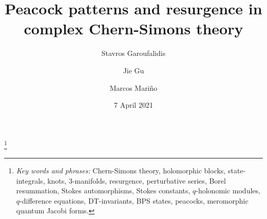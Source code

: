 \documentclass[12pt,reqno]{amsart}
\theoremstyle{definition}
\def\md{\mathbf}
\newcommand{\knot}[1]{\md{#1}}
\begin{document}
\title[Peacock patterns and resurgence in complex Chern-Simons
theory]{Peacock patterns and resurgence in
  complex Chern-Simons theory} \author{Stavros Garoufalidis}
\address{%
  International Center for Mathematics, Department of Mathematics \\
  Southern University of Science and Technology \\
  Shenzhen, China \newline
  {\tt \url{http://people.mpim-bonn.mpg.de/stavros}}}
\author{Jie Gu}
\address{D\'epartement de Physique Th\'eorique, Universit\'e de Gen\`eve \\
Universit\'e de Gen\`eve, 1211 Gen\`eve 4, Switzerland}
\author{Marcos Mari\~no}
\address{Section de Math\'ematiques et D\'epartement de Physique Th\'eorique\\
Universit\'e de Gen\`eve, 1211 Gen\`eve 4, Switzerland  \newline
  {\tt \url{http://www.marcosmarino.net}}}


\thanks{
{\em Key words and phrases:}
Chern-Simons theory, holomorphic blocks, state-integrals, knots, 3-manifolds,
resurgence, perturbative series, Borel resummation, Stokes automorphisms,
Stokes constants, $q$-holonomic modules, $q$-difference equations, DT-invariants,
BPS states, peacocks, meromorphic quantum Jacobi forms.
}

\date{7 April 2021}%
\end{document}
